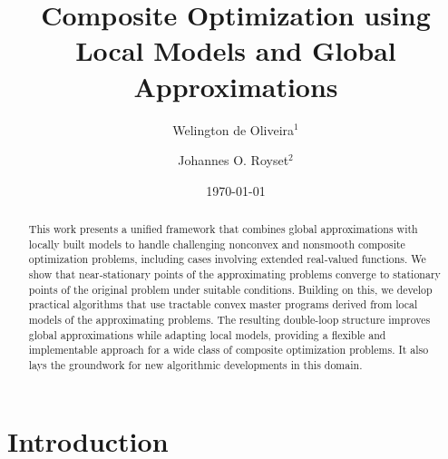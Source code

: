 \documentclass[smallextended,envcountsect]{svjour3}
\begin{document}
\title{Composite Optimization using Local Models and Global Approximations}




\author{Welington de Oliveira$^1$ \and Johannes O. Royset$^2$}




\date{\today}

 
\maketitle

\begin{abstract}
This work presents a unified framework that combines global approximations with locally built models to handle challenging nonconvex and nonsmooth composite optimization problems, including cases involving extended real‑valued functions. We show that near‑stationary points of the approximating problems converge to stationary points of the original problem under suitable conditions. Building on this, we develop practical algorithms that use tractable convex master programs derived from local models of the approximating problems. The resulting double-loop structure improves global approximations while adapting local models, providing a flexible and implementable approach for a wide class of composite optimization problems. It also lays the groundwork for new algorithmic developments in this domain.
\end{abstract}



\section{Introduction}\label{sec:introduction}
\end{document}
